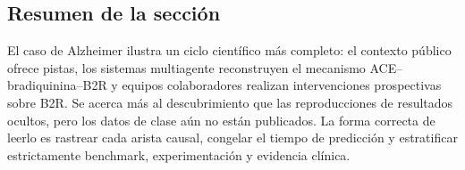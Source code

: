 \subsection{Resumen de la sección}

El caso de Alzheimer ilustra un ciclo científico más completo: el contexto público ofrece pistas, los sistemas multiagente reconstruyen el mecanismo ACE--bradiquinina--B2R y equipos colaboradores realizan intervenciones prospectivas sobre B2R. Se acerca más al descubrimiento que las reproducciones de resultados ocultos, pero los datos de clase aún no están publicados. La forma correcta de leerlo es rastrear cada arista causal, congelar el tiempo de predicción y estratificar estrictamente benchmark, experimentación y evidencia clínica.
